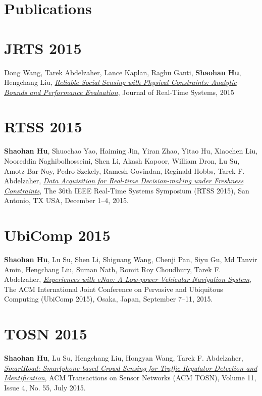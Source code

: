 \section{\sc Publications}

\section{\sc JRTS 2015}\hypertarget{wang2015jrts}{} Dong Wang, Tarek Abdelzaher, Lance Kaplan, Raghu Ganti, \textbf{Shaohan Hu}, Hengchang Liu, \href{}{\emph{Reliable Social Sensing with Physical Constraints: Analytic Bounds and Performance Evaluation}}, \textsf{Journal of Real-Time Systems}, 2015

\section{\sc RTSS 2015}\hypertarget{hu2015rtss}{} \textbf{Shaohan Hu}, Shuochao Yao, Haiming Jin, Yiran Zhao, Yitao Hu, Xiaochen Liu, Nooreddin Naghibolhosseini, Shen Li, Akash Kapoor, William Dron, Lu Su, Amotz Bar-Noy, Pedro Szekely, Ramesh Govindan, Reginald Hobbs, Tarek F. Abdelzaher, \href{}{\emph{Data Acquisition for Real-time Decision-making under Freshness Constraints}}, \textsf{The 36th IEEE Real-Time Systems Symposium (RTSS 2015)}, San Antonio, TX USA, December 1--4, 2015.

\section{\sc UbiComp 2015}\hypertarget{hu2015ubicomp}{} \textbf{Shaohan Hu}, Lu Su, Shen Li, Shiguang Wang, Chenji Pan, Siyu Gu, Md Tanvir Amin, Hengchang Liu, Suman Nath, Romit Roy Choudhury, Tarek F. Abdelzaher, \href{}{\emph{Experiences with eNav: A Low-power Vehicular Navigation System}}, \textsf{The ACM International Joint Conference on Pervasive and Ubiquitous Computing (UbiComp 2015)}, Osaka, Japan, September 7--11, 2015.

\section{\sc TOSN 2015}\hypertarget{hu2015tosn}{} \textbf{Shaohan Hu}, Lu Su, Hengchang Liu, Hongyan Wang, Tarek F. Abdelzaher, \href{http://dl.acm.org/citation.cfm?id=2770876}{\emph{SmartRoad: Smartphone-based Crowd Sensing for Traffic Regulator Detection and Identification}}, \textsf{ACM Transactions on Sensor Networks (ACM TOSN)}, Volume 11, Issue 4, No. 55, July 2015.

